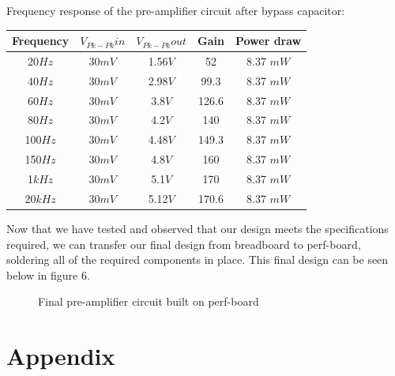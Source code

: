 \documentclass[a4paper,11pt]{article}
\begin{document}
Frequency response of the pre-amplifier circuit after bypass capacitor:\\
\begin{tabular}{|c|c|c|c|c|}  
\hline
Frequency &  \(\displaystyle V_{Pk-Pk}in \)  & \(\displaystyle V_{Pk-Pk} out\) & Gain & Power draw\\
\hline
20\(\displaystyle Hz \) & 30\(\displaystyle mV\)     &  1.56\(\displaystyle V\)  & 52    & 8.37 \(\displaystyle mW\)\\
40\(\displaystyle Hz \) &  30\(\displaystyle mV\)     &  2.98\(\displaystyle V\)    & 99.3  & 8.37 \(\displaystyle mW\)\\
60\(\displaystyle Hz \) &  30\(\displaystyle mV\)    & 3.8\(\displaystyle V\)     & 126.6    & 8.37 \(\displaystyle mW\)  \\
80\(\displaystyle Hz \)&  30\(\displaystyle mV\)       &  4.2\(\displaystyle V\)    & 140    & 8.37 \(\displaystyle mW\)\\
100\(\displaystyle Hz \)&  30\(\displaystyle mV\)    &  4.48\(\displaystyle V\)     & 149.3    & 8.37 \(\displaystyle mW\) \\
150\(\displaystyle Hz \)&  30\(\displaystyle mV\)    &  4.8\(\displaystyle V\)     & 160    & 8.37 \(\displaystyle mW\) \\
1\(\displaystyle k Hz \)&  30\(\displaystyle mV\)     &  5.1\(\displaystyle V\)     & 170   & 8.37 \(\displaystyle mW\)\\
20\(\displaystyle k Hz \)& 30\(\displaystyle mV\)     &  5.12\(\displaystyle V\)    & 170.6    & 8.37 \(\displaystyle mW\) \\
\hline
\end{tabular}

\pagebreak

Now that we have tested and observed that our design meets the specifications required, we can transfer our final design from breadboard to perf-board, soldering all of the required components in place. This final design can be seen below in figure 6. 

\begin{figure}[h]
 \begin{center}
  \caption{Final pre-amplifier circuit built on perf-board}
 \end{center}
\end{figure}









\section{Appendix} 






 
\end{document}
